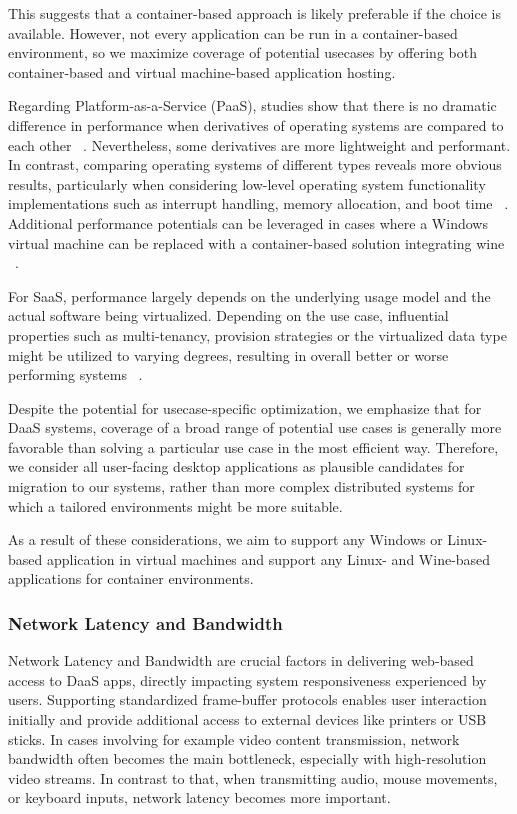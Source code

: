 \documentclass[runningheads]{llncs}
\begin{document}
This suggests that a container-based approach is likely preferable
if the choice is available.
However, not every application can be run
in a container-based environment,
so we maximize coverage of potential usecases
by offering both container-based and virtual machine-based application hosting.

Regarding Platform-as-a-Service (PaaS),
studies show that there is no dramatic difference in performance
when derivatives of operating systems are compared to each other
~\cite{balen2020performance,boras2020performance}.
Nevertheless, some derivatives are more lightweight and performant.
In contrast, comparing operating systems of different types
reveals more obvious results, particularly when considering
low-level operating system functionality implementations
such as interrupt handling, memory allocation, and boot time
~\cite{sergeev2022docker,sulaiman2021comparison}.
Additional performance potentials can be leveraged
in cases where a Windows virtual machine can be replaced
with a container-based solution integrating wine
~\cite{huang2012performance}.  %

For SaaS, performance largely depends on the underlying usage model
and the actual software being virtualized.
Depending on the use case, influential properties
such as multi-tenancy, provision strategies or the virtualized data type
might be utilized to varying degrees, resulting in overall
better or worse performing systems ~\cite{zhong2010virtualization}.

Despite the potential for usecase-specific optimization,
we emphasize that for DaaS systems,
coverage of a broad range of potential use cases is generally more favorable
than solving a particular use case in the most efficient way.
Therefore, we consider all user-facing desktop applications
as plausible candidates for migration to our systems,
rather than more complex distributed systems
for which a tailored environments might be more suitable.

As a result of these considerations, we aim to support
any Windows or Linux-based application in virtual machines
and support any Linux- and Wine-based applications for container environments.

\subsubsection{Network Latency and Bandwidth}
Network Latency and Bandwidth are crucial factors
in delivering web-based access to DaaS apps,
directly impacting system responsiveness experienced by users.
Supporting standardized frame-buffer protocols enables user interaction initially
and provide additional access to external devices like printers or USB sticks.
In cases involving for example video content transmission,
network bandwidth often becomes the main bottleneck,
especially with high-resolution video streams.
In contrast to that,  when transmitting audio, mouse movements,
or keyboard inputs, network latency becomes more important.
\end{document}
